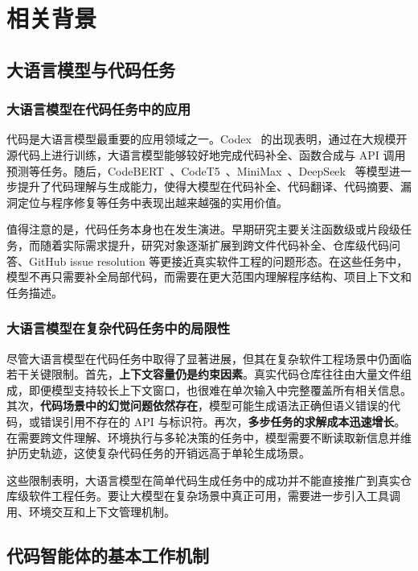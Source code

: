 
\chapter{相关背景}

\section{大语言模型与代码任务}
\subsection{大语言模型在代码任务中的应用}

代码是大语言模型最重要的应用领域之一。Codex~\cite{chen2021evaluating} 的出现表明，通过在大规模开源代码上进行训练，大语言模型能够较好地完成代码补全、函数合成与 API 调用预测等任务。随后，CodeBERT~\cite{feng2020codebert}、CodeT5~\cite{wang2021codet5}、MiniMax~\cite{MiniMax}、DeepSeek~\cite{bi2024deepseek} 等模型进一步提升了代码理解与生成能力，使得大模型在代码补全、代码翻译、代码摘要、漏洞定位与程序修复等任务中表现出越来越强的实用价值。

值得注意的是，代码任务本身也在发生演进。早期研究主要关注函数级或片段级任务，而随着实际需求提升，研究对象逐渐扩展到跨文件代码补全、仓库级代码问答、GitHub issue resolution 等更接近真实软件工程的问题形态。在这些任务中，模型不再只需要补全局部代码，而需要在更大范围内理解程序结构、项目上下文和任务描述。

\subsection{大语言模型在复杂代码任务中的局限性}

尽管大语言模型在代码任务中取得了显著进展，但其在复杂软件工程场景中仍面临若干关键限制。首先，\textbf{上下文容量仍是约束因素}。真实代码仓库往往由大量文件组成，即便模型支持较长上下文窗口，也很难在单次输入中完整覆盖所有相关信息。其次，\textbf{代码场景中的幻觉问题依然存在}，模型可能生成语法正确但语义错误的代码，或错误引用不存在的 API 与标识符。再次，\textbf{多步任务的求解成本迅速增长}。在需要跨文件理解、环境执行与多轮决策的任务中，模型需要不断读取新信息并维护历史轨迹，这使复杂代码任务的开销远高于单轮生成场景。

这些限制表明，大语言模型在简单代码生成任务中的成功并不能直接推广到真实仓库级软件工程任务。要让大模型在复杂场景中真正可用，需要进一步引入工具调用、环境交互和上下文管理机制。


\section{代码智能体的基本工作机制}

